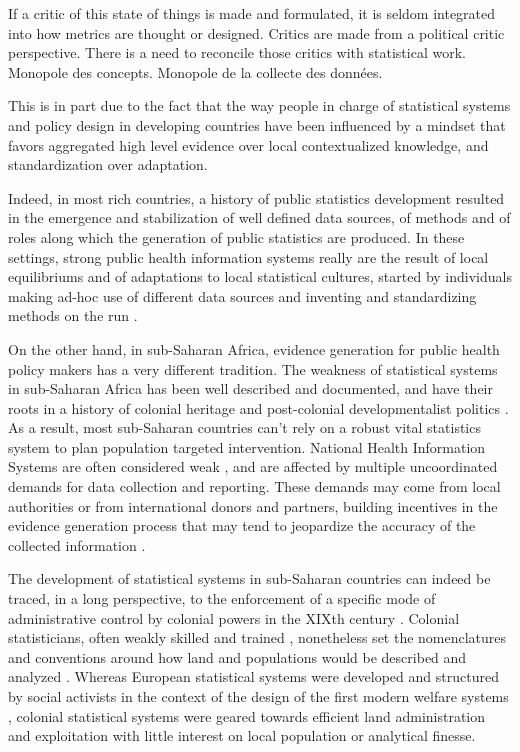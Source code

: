 
If a critic of this state of things is made and formulated, it is seldom integrated into how metrics are thought or designed. Critics are made from a political critic perspective. There is a need to reconcile those critics with statistical work. Monopole des concepts. Monopole de la collecte des données.



This is in part due to the fact that the way people in charge of statistical systems and policy design in developing countries have been influenced by a mindset that favors aggregated high level evidence over local contextualized knowledge, and standardization over adaptation.

Indeed, in most rich countries, a history of public statistics development resulted in the emergence and stabilization of well defined data sources, of methods and of roles along which the generation of public statistics are produced. In these settings, strong public health information systems really are the result of local equilibriums and of adaptations to local statistical cultures, started by individuals making ad-hoc use of different data sources and inventing and standardizing methods on the run \citep{lecuyer_medecins_1987}.

On the other hand, in sub-Saharan Africa, evidence generation for public health policy makers has a very different tradition. The weakness of statistical systems in sub-Saharan Africa has been well described and documented, and have their roots in a history of colonial heritage and post-colonial developmentalist politics \citep{jerven_poor_2013}. As a result, most sub-Saharan countries can't rely on a robust vital statistics system to plan population targeted intervention. National Health Information Systems are often considered weak \citep{abou-zahr_better_2010,kiberu_strengthening_2014}, and are affected by multiple uncoordinated demands for data collection and reporting. These demands may come from local authorities or from international donors and partners, building incentives in the evidence generation process that may tend to jeopardize the accuracy of the collected information \citep{sandefur_political_2013}.

The development of statistical systems in sub-Saharan countries can indeed  be traced, in a long perspective, to the enforcement of  a specific mode of administrative control by colonial powers in the XIXth century \citep{appadurai_number_1996,cordell_couting_2010,gervais_how_2010}.
Colonial statisticians, often weakly skilled and trained \citep{kateb_gestion_1998,cordell_couting_2010}, nonetheless set the nomenclatures and conventions around how land and populations would be described and analyzed \citep{rambert_cartographie_1922,gervais_how_2010}.
Whereas European statistical systems were developed and structured by social activists in the context of the design of the first modern welfare systems \citep{desrosieres_politique_1993,desrosieres_administrator_1997}, colonial statistical systems were geared towards efficient land administration and exploitation \citep{rambert_cartographie_1922,de_martonne_cartographie_1931} with little interest on local population or analytical finesse.

